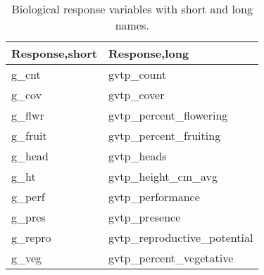 \documentclass[
]{article}
\begin{document}
\begin{table}

\caption{\label{tab:tab-responses}Biological response variables with short and long names.}
\centering
\begin{tabular}[t]{l|l}
\hline
Response,short & Response,long\\
\hline
g\_cnt & gvtp\_count\\
\hline
g\_cov & gvtp\_cover\\
\hline
g\_flwr & gvtp\_percent\_flowering\\
\hline
g\_fruit & gvtp\_percent\_fruiting\\
\hline
g\_head & gvtp\_heads\\
\hline
g\_ht & gvtp\_height\_cm\_avg\\
\hline
g\_perf & gvtp\_performance\\
\hline
g\_pres & gvtp\_presence\\
\hline
g\_repro & gvtp\_reproductive\_potential\\
\hline
g\_veg & gvtp\_percent\_vegetative\\
\hline
\end{tabular}
\end{table}
\end{document}
